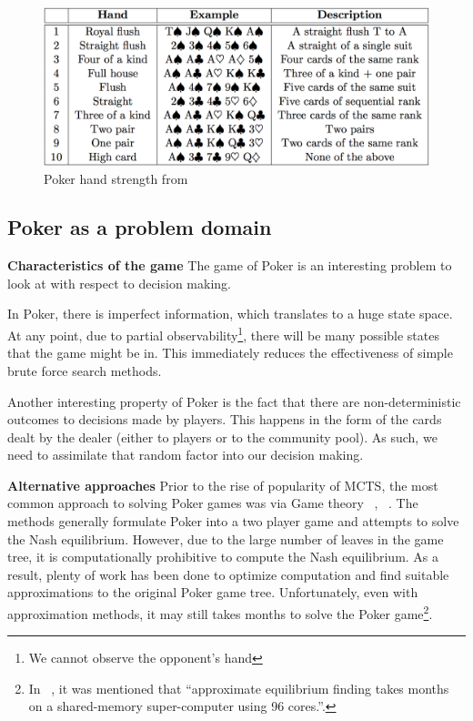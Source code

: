 \documentclass[11pt, a4paper, oneside]{article}
\begin{document}
\begin{figure}[h!]
\centering
\includegraphics[width=\textwidth]{pokerhand.png}
\caption{Poker hand strength from ~\cite{Kleij2010}}
\label{fig:Poker hand strength}
\end{figure}

\subsection{Poker as a problem domain}
\textbf{Characteristics of the game}
The game of Poker is an interesting problem to look at with respect to decision making.

In Poker, there is imperfect information, which translates to a huge state space. At any point, due to partial observability\footnote{We cannot observe the opponent's hand}, there will be many possible states that the game might be in. This immediately reduces the effectiveness of simple brute force search methods.

Another interesting property of Poker is the fact that there are non-deterministic outcomes to decisions made by players. This happens in the form of the cards dealt by the dealer (either to players or to the community pool). As such, we need to assimilate that random factor into our decision making.

\textbf{Alternative approaches}
Prior to the rise of popularity of MCTS, the most common approach to solving Poker games was via Game theory ~\cite{Johanson2007}, ~\cite{Sandholm2010}. The methods generally formulate Poker into a two player game and attempts to solve the Nash equilibrium. However, due to the large number of leaves in the game tree, it is computationally prohibitive to compute the Nash equilibrium. As a result, plenty of work has been done to optimize computation and find suitable approximations to the original Poker game tree. Unfortunately, even with approximation methods, it may still takes months to solve the Poker game\footnote{In ~\cite{Sandholm2010}, it was mentioned that ``approximate equilibrium finding takes months on a shared-memory super-computer using 96 cores.''.}.
\end{document}

